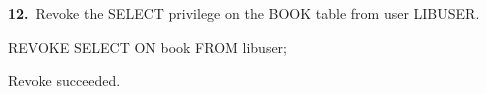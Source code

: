 \noindent\begin{minipage}{\linewidth}
\begingroup{}
{\fontsize{14}{17}\selectfont\textbf{12.}}\ Revoke the SELECT privilege on the BOOK table from user LIBUSER.\par
\endgroup\vspace{12pt}


\begin{sqlcode}
REVOKE SELECT ON book FROM libuser;
\end{sqlcode}

\vspace{18pt}


\begin{sqlout}[fontsize=\small]
Revoke succeeded.
\end{sqlout}
\end{minipage}\par\vspace{24pt}

